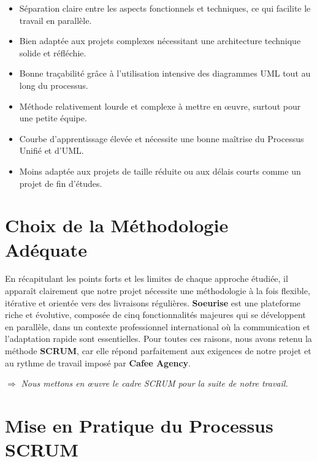 \documentclass[12pt,a4paper]{report}
\begin{document}
	\begin{itemize}
		\item[\textcolor{green}{\textbf{+}}] Séparation claire entre les aspects 
		fonctionnels et techniques, ce qui facilite le travail en parallèle.
		\item[\textcolor{green}{\textbf{+}}] Bien adaptée aux projets complexes 
		nécessitant une architecture technique solide et réfléchie.
		\item[\textcolor{green}{\textbf{+}}] Bonne traçabilité grâce à l'utilisation 
		intensive des diagrammes UML tout au long du processus.
		\item[\textcolor{red}{\textbf{--}}] Méthode relativement lourde et complexe 
		à mettre en œuvre, surtout pour une petite équipe.
		\item[\textcolor{red}{\textbf{--}}] Courbe d'apprentissage élevée et nécessite 
		une bonne maîtrise du Processus Unifié et d'UML.
		\item[\textcolor{red}{\textbf{--}}] Moins adaptée aux projets de taille réduite 
		ou aux délais courts comme un projet de fin d'études.
	\end{itemize}
	\section{Choix de la Méthodologie Adéquate}
	
	En récapitulant les points forts et les limites de chaque approche étudiée, il apparaît 
	clairement que notre projet nécessite une méthodologie à la fois flexible, itérative 
	et orientée vers des livraisons régulières. \textbf{Soeurise} est une plateforme 
	riche et évolutive, composée de cinq fonctionnalités majeures qui se développent 
	en parallèle, dans un contexte professionnel international où la communication et 
	l'adaptation rapide sont essentielles. Pour toutes ces raisons, nous avons retenu 
	la méthode \textbf{SCRUM}, car elle répond parfaitement aux exigences de notre projet 
	et au rythme de travail imposé par \textbf{Cafee Agency}.
	
	\begin{center}
		\(\Rightarrow\) \textit{Nous mettons en œuvre le cadre SCRUM pour la suite de notre travail.}
	\end{center}
	
	\section{Mise en Pratique du Processus SCRUM}
	
\end{document}
